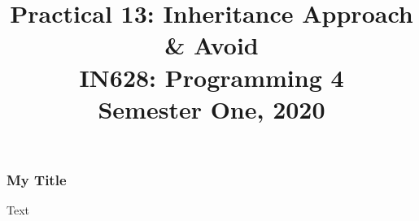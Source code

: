 \documentclass[10pt]{beamer}
\author{}
\title{Practical 13: Inheritance Approach \& Avoid\\IN628: Programming 4\\Semester One, 2020}
\institute{Otago Polytechnic, Dunedin, New Zealand}
\date{}
\begin{document}
\begin{frame}
	\titlepage
\end{frame}

\begin{frame}
	\frametitle{My Title} 
	Text
\end{frame}
  
\end{document}
